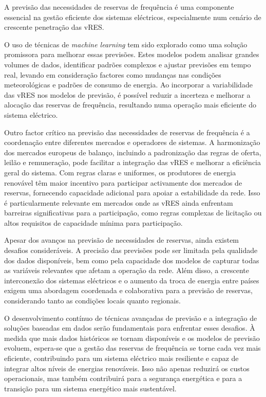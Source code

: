 A previsão das necessidades de reservas de frequência é uma componente essencial na gestão eficiente dos sistemas eléctricos, especialmente num cenário de crescente penetração das \gls{vRES}.\par
O uso de técnicas de \textit{machine learning} tem sido explorado como uma solução promissora para melhorar essas previsões. Estes modelos podem analisar grandes volumes de dados, identificar padrões complexos e ajustar previsões em tempo real, levando em consideração factores como mudanças nas condições meteorológicas e padrões de consumo de energia. Ao incorporar a variabilidade das \gls{vRES} nos modelos de previsão, é possível reduzir a incerteza e melhorar a alocação das reservas de frequência, resultando numa operação mais eficiente do sistema eléctrico.\par
Outro factor crítico na previsão das necessidades de reservas de frequência é a coordenação entre diferentes mercados e operadores de sistemas. A harmonização dos mercados europeus de balanço, incluindo a padronização das regras de oferta, leilão e remuneração, pode facilitar a integração das \gls{vRES} e melhorar a eficiência geral do sistema. Com regras claras e uniformes, os produtores de energia renovável têm maior incentivo para participar activamente dos mercados de reservas, fornecendo capacidade adicional para apoiar a estabilidade da rede. Isso é particularmente relevante em mercados onde as \gls{vRES} ainda enfrentam barreiras significativas para a participação, como regras complexas de licitação ou altos requisitos de capacidade mínima para participação.\par
Apesar dos avanços na previsão de necessidades de reservas, ainda existem desafios consideráveis. A precisão das previsões pode ser limitada pela qualidade dos dados disponíveis, bem como pela capacidade dos modelos de capturar todas as variáveis relevantes que afetam a operação da rede. Além disso, a crescente interconexão dos sistemas eléctricos e o aumento da troca de energia entre países exigem uma abordagem coordenada e colaborativa para a previsão de reservas, considerando tanto as condições locais quanto regionais.\par
O desenvolvimento contínuo de técnicas avançadas de previsão e a integração de soluções baseadas em dados serão fundamentais para enfrentar esses desafios. À medida que mais dados históricos se tornam disponíveis e os modelos de previsão evoluem, espera-se que a gestão das reservas de frequência se torne cada vez mais eficiente, contribuindo para um sistema eléctrico mais resiliente e capaz de integrar altos níveis de energias renováveis. Isso não apenas reduzirá os custos operacionais, mas também contribuirá para a segurança energética e para a transição para um sistema energético mais sustentável.\par

